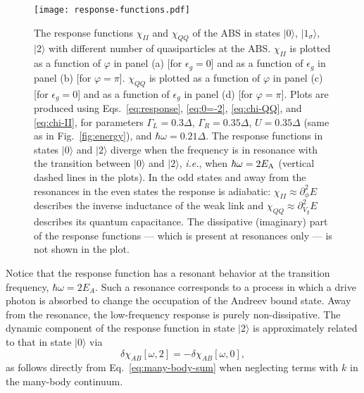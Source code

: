 \documentclass[aps,reprint,longbibliography, prb]{revtex4-2}
\begin{document}
\begin{figure*}[t]
  \begin{center}
    \texttt{[image: response-functions.pdf]}
    \caption{The response functions $\chi_{II}$ and $\chi_{QQ}$ of the ABS in states $|0\rangle$, $|1_\sigma\rangle$, $|2\rangle$ with different number of quasiparticles at the ABS. $\chi_{II}$ is plotted as a function of $\varphi$ in panel (a) [for $\epsilon_g = 0$] and as a function of $\epsilon_g$ in panel (b) [for $\varphi = \pi$]. $\chi_{QQ}$ is plotted as a function of $\varphi$ in panel (c) [for $\epsilon_g = 0$] and as a function of $\epsilon_g$ in panel (d) [for $\varphi = \pi$]. Plots are produced using Eqs.~\eqref{eq:response}, \eqref{eq:0=-2}, \eqref{eq:chi-QQ}, and \eqref{eq:chi-II}, for parameters $\Gamma_L = 0.3 \Delta$, $\Gamma_R = 0.35 \Delta$, $U = 0.35 \Delta$ (same as in Fig.~\ref{fig:energy}), and $\hbar\omega = 0.21 \Delta$. The response functions in states $|0\rangle$ and $|2\rangle$ diverge when the frequency is in resonance with the transition between $|0\rangle$ and $|2\rangle$, \textit{i.e.}, when $\hbar\omega = 2E_{\rm A}$ (vertical dashed lines in the plots). In the odd states and away from the resonances in the even states the response is adiabatic: $\chi_{II}\approx \partial_\phi^2 E$ describes the inverse inductance of the weak link and $\chi_{QQ} \approx \partial_{V_g}^2 E$ describes its quantum capacitance. The dissipative (imaginary) part of the response functions --- which is present at resonances only --- is not shown in the plot.}
    \label{fig:response}
  \end{center}
\end{figure*}
Notice that the response function has a resonant behavior at the transition frequency, $\hbar\omega = 2E_A$. Such a resonance corresponds to a process in which a drive photon is absorbed to change the occupation of the Andreev bound state. Away from the resonance, the low-frequency response is purely non-dissipative. The dynamic component of the response function in state $|2\rangle$ is approximately related to that in state $|0\rangle$ via
\begin{equation}
    \label{eq:0=-2}
    \delta\chi_{AB}[\omega,2] = -\delta\chi_{AB}[\omega,0],
\end{equation}
as follows directly from Eq.~\eqref{eq:many-body-sum} when neglecting terms with $k$ in the many-body continuum.
\end{document}
